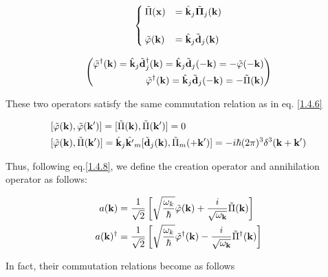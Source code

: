 \[\begin{cases}
\tilde{\Pi}({\bf x})& = \hat{\bf k}_j\tilde{\bm \Pi}_j({\bf k})\\
&\\
\tilde{\varphi}({\bf k})& = \hat{\bf k}_j\tilde{\bf d}_j({\bf k})
\end{cases} \]

\[\left(\begin{split}
\tilde{\varphi}^\dagger({\bf k})= \hat{\bf k}_j\tilde{\bf d}_j^\dagger({\bf k}) = \hat{\bf k}_j\tilde{\bf d}_j(-{\bf k}) = -\tilde{\varphi}(-\bf k)\\
\tilde{\varphi}^\dagger({\bf k}) = \hat{\bf k}_j\tilde{\bf d}_j(-{\bf k}) = -\tilde{\Pi}({\bf k})
\end{split}\right) \]

These two operators satisfy the same commutation relation as in eq. \eqref{1.4.6}

\[\begin{split}
&[\tilde\varphi({\bf k}),\tilde\varphi({\bf k'})] = [\tilde\Pi({\bf k}),\tilde\Pi({\bf k'})] = 0\\
&[\tilde\varphi({\bf k}),\tilde\Pi({\bf k'})] = \hat{\bf k}_j\hat{\bf k'}_m[\tilde{\bf d}_j({\bf k}),\tilde\Pi_m({+\bf k'})] = -i\hbar(2\pi)^3\delta^3({\bf k+k'})
\end{split}\]

Thus, following eq.\eqref{1.4.8}, we define the creation operator and annihilation operator as follows:

\[\begin{split}
a({\bf k}) &= \frac{1}{\sqrt{2}}\left[\sqrt{\frac{\omega_k}{\hbar}}\tilde{\varphi}({\bf k})+\frac{i}{\sqrt{\omega_{\bf k}}}\tilde{\Pi}({\bf k})\right]\\
a({\bf k})^\dagger &= \frac{1}{\sqrt{2}}\left[\sqrt{\frac{\omega_k}{\hbar}}\tilde{\varphi}^\dagger({\bf k})-\frac{i}{\sqrt{\omega_{\bf k}}}\tilde{\Pi}^\dagger({\bf k})\right]
\end{split} \]

In fact, their commutation relations become as follows


